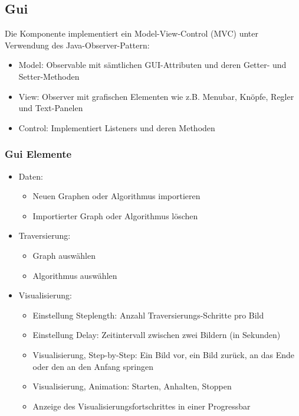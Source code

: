 \subsection{Gui}
\label{subsec:Gui}
Die Komponente implementiert ein Model-View-Control (MVC) unter Verwendung des Java-Observer-Pattern:
\begin{itemize}
  \item Model: Observable mit s\"amtlichen GUI-Attributen und deren Getter- und Setter-Methoden
  \item View: Observer mit grafischen Elementen wie z.B. Menubar, Kn\"opfe, Regler und Text-Panelen
  \item Control: Implementiert Listeners und deren Methoden
\end{itemize}
% 
\subsubsection{Gui Elemente}
\label{subsubsec:Gui Elemente}
\begin{itemize}
  \item Daten:
  \begin{itemize}
    \item Neuen Graphen oder Algorithmus importieren
    \item Importierter Graph oder Algorithmus l\"oschen
  \end{itemize}
  \item Traversierung:
  \begin{itemize}
    \item Graph ausw\"ahlen
    \item Algorithmus ausw\"ahlen
  \end{itemize}
  \item Visualisierung:
  \begin{itemize}
      \item Einstellung Steplength: Anzahl Traversierungs-Schritte pro Bild
      \item Einstellung Delay: Zeitintervall zwischen zwei Bildern (in Sekunden)      
      \item Visualisierung, Step-by-Step: Ein Bild vor, ein Bild zur\"uck, an das Ende oder den an den Anfang springen
      \item Visualisierung, Animation: Starten, Anhalten, Stoppen
      \item Anzeige des Visualisierungsfortschrittes in einer Progressbar
  \end{itemize}
\end{itemize}
% 
